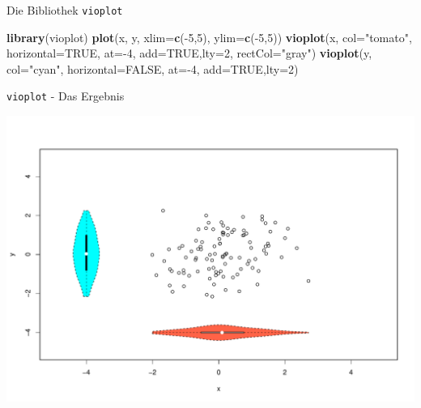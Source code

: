 \documentclass[ignorenonframetext,]{beamer}
\newenvironment{Shaded}{}{}
\newcommand{\KeywordTok}[1]{\textcolor[rgb]{0.00,0.44,0.13}{\textbf{{#1}}}}
\newcommand{\DataTypeTok}[1]{\textcolor[rgb]{0.56,0.13,0.00}{{#1}}}
\newcommand{\DecValTok}[1]{\textcolor[rgb]{0.25,0.63,0.44}{{#1}}}
\newcommand{\StringTok}[1]{\textcolor[rgb]{0.25,0.44,0.63}{{#1}}}
\newcommand{\OtherTok}[1]{\textcolor[rgb]{0.00,0.44,0.13}{{#1}}}
\newcommand{\NormalTok}[1]{{#1}}
\begin{document}
\begin{frame}[fragile]{Die Bibliothek \texttt{vioplot}}

\begin{Shaded}
\begin{Highlighting}[]
\KeywordTok{library}\NormalTok{(vioplot)}
\KeywordTok{plot}\NormalTok{(x, y, }\DataTypeTok{xlim=}\KeywordTok{c}\NormalTok{(-}\DecValTok{5}\NormalTok{,}\DecValTok{5}\NormalTok{), }\DataTypeTok{ylim=}\KeywordTok{c}\NormalTok{(-}\DecValTok{5}\NormalTok{,}\DecValTok{5}\NormalTok{))}
\KeywordTok{vioplot}\NormalTok{(x, }\DataTypeTok{col=}\StringTok{"tomato"}\NormalTok{, }\DataTypeTok{horizontal=}\OtherTok{TRUE}\NormalTok{, }\DataTypeTok{at=}\NormalTok{-}\DecValTok{4}\NormalTok{, }
        \DataTypeTok{add=}\OtherTok{TRUE}\NormalTok{,}\DataTypeTok{lty=}\DecValTok{2}\NormalTok{, }\DataTypeTok{rectCol=}\StringTok{"gray"}\NormalTok{)}
\KeywordTok{vioplot}\NormalTok{(y, }\DataTypeTok{col=}\StringTok{"cyan"}\NormalTok{, }\DataTypeTok{horizontal=}\OtherTok{FALSE}\NormalTok{, }\DataTypeTok{at=}\NormalTok{-}\DecValTok{4}\NormalTok{, }
        \DataTypeTok{add=}\OtherTok{TRUE}\NormalTok{,}\DataTypeTok{lty=}\DecValTok{2}\NormalTok{)}
\end{Highlighting}
\end{Shaded}

\end{frame}

\begin{frame}{\texttt{vioplot} - Das Ergebnis}

\includegraphics{R_intern_files/figure-beamer/unnamed-chunk-169-1.pdf}

\end{frame}
\end{document}
